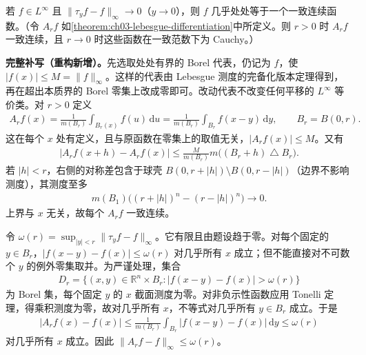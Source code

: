 \documentclass[../../main.tex]{subfiles}
\begin{document}
\begin{exercise}\label{exercise:ch08-linfty-uc-representative}
若 $f\in L^\infty$ 且 $\|\tau_yf-f\|_\infty\to0$（$y\to0$），则 $f$ 几乎处处等于一个一致连续函数。（令 $A_rf$ 如\cref{theorem:ch03-lebesgue-differentiation}中所定义。则 $r>0$ 时 $A_rf$ 一致连续，且 $r\to0$ 时这些函数在一致范数下为 Cauchy。）
\end{exercise}
\begin{solution}
\textbf{完整补写（重构新增）。}先选取处处有界的 Borel 代表，仍记为 $f$，使 $|f(x)|\leqslant M=\|f\|_\infty$。这样的代表由 Lebesgue 测度的完备化版本定理得到，再在超出本质界的 Borel 零集上改成零即可。改动代表不改变任何平移的 $L^\infty$ 等价类。对 $r>0$ 定义
\begin{align*}
A_rf(x)=\frac1{m(B_r)}\int_{B_r(x)}f(u)\,\mathrm du
=\frac1{m(B_r)}\int_{B_r}f(x-y)\,\mathrm dy,
\qquad B_r=B(0,r).
\end{align*}
这在每个 $x$ 处有定义，且与原函数在零集上的取值无关，$|A_rf(x)|\leqslant M$。又有
\begin{align*}
|A_rf(x+h)-A_rf(x)|
\leqslant\frac{M}{m(B_r)}m\bigl((B_r+h)\mathbin\triangle B_r\bigr).
\end{align*}
若 $|h|<r$，右侧的对称差包含于球壳 $B(0,r+|h|)\setminus B(0,r-|h|)$（边界不影响测度），其测度至多
\begin{align*}
m(B_1)\bigl((r+|h|)^n-(r-|h|)^n\bigr)\longrightarrow0.
\end{align*}
上界与 $x$ 无关，故每个 $A_rf$ 一致连续。

令 $\omega(r)=\sup_{|y|<r}\|\tau_yf-f\|_\infty$。它有限且由题设趋于零。对每个固定的 $y\in B_r$，$|f(x-y)-f(x)|\leqslant\omega(r)$ 对几乎所有 $x$ 成立；但不能直接对不可数个 $y$ 的例外零集取并。为严谨处理，集合
\begin{align*}
D_r=\{(x,y)\in\mathbb R^n\times B_r:
|f(x-y)-f(x)|>\omega(r)\}
\end{align*}
为 Borel 集，每个固定 $y$ 的 $x$ 截面测度为零。对非负示性函数应用 Tonelli 定理，得乘积测度为零，故对几乎所有 $x$，不等式对几乎所有 $y\in B_r$ 成立。于是
\begin{align*}
|A_rf(x)-f(x)|\leqslant
\frac1{m(B_r)}\int_{B_r}|f(x-y)-f(x)|\,\mathrm dy
\leqslant\omega(r)
\end{align*}
对几乎所有 $x$ 成立。因此 $\|A_rf-f\|_\infty\leqslant\omega(r)$。


\end{solution}
\end{document}

